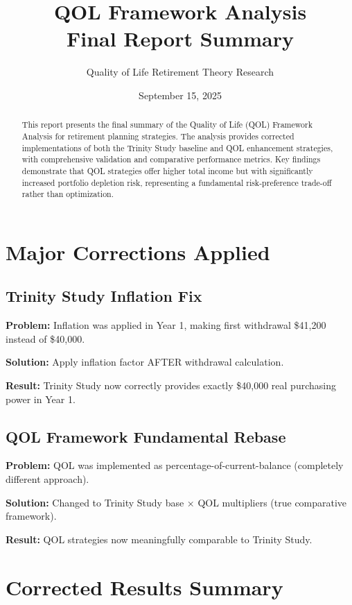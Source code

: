 \documentclass[11pt,letterpaper]{article}
\title{\textbf{QOL Framework Analysis\\Final Report Summary}}
\author{Quality of Life Retirement Theory Research}
\date{September 15, 2025}
\begin{document}
\maketitle

\begin{abstract}
This report presents the final summary of the Quality of Life (QOL) Framework Analysis for retirement planning strategies. The analysis provides corrected implementations of both the Trinity Study baseline and QOL enhancement strategies, with comprehensive validation and comparative performance metrics. Key findings demonstrate that QOL strategies offer higher total income but with significantly increased portfolio depletion risk, representing a fundamental risk-preference trade-off rather than optimization.
\end{abstract}

\tableofcontents
\newpage

\section{Major Corrections Applied}

\subsection{Trinity Study Inflation Fix}
\textbf{Problem:} Inflation was applied in Year 1, making first withdrawal \$41,200 instead of \$40,000.

\textbf{Solution:} Apply inflation factor AFTER withdrawal calculation.

\textbf{Result:} Trinity Study now correctly provides exactly \$40,000 real purchasing power in Year 1.

\subsection{QOL Framework Fundamental Rebase}
\textbf{Problem:} QOL was implemented as percentage-of-current-balance (completely different approach).

\textbf{Solution:} Changed to Trinity Study base × QOL multipliers (true comparative framework).

\textbf{Result:} QOL strategies now meaningfully comparable to Trinity Study.

\section{Corrected Results Summary}
\end{document}
